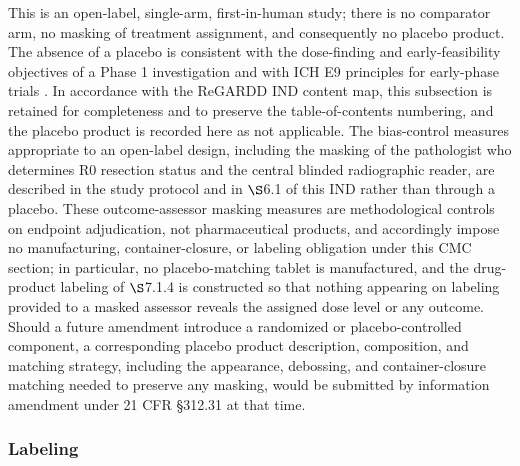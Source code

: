 This is an open-label, single-arm, first-in-human study; there is no comparator
arm, no masking of treatment assignment, and consequently no placebo product. The
absence of a placebo is consistent with the dose-finding and early-feasibility
objectives of a Phase 1 investigation and with ICH E9 principles for early-phase
trials \cite{ichpaistduni,phase1guidance}. In accordance with the ReGARDD IND
content map, this subsection is retained for completeness and to preserve the
table-of-contents numbering, and the placebo product is recorded here as not
applicable. The bias-control measures appropriate to an open-label design,
including the masking of the pathologist who determines R0 resection status and
the central blinded radiographic reader, are described in the study protocol and
in $\S$6.1 of this IND rather than through a placebo. These outcome-assessor
masking measures are methodological controls on endpoint adjudication, not
pharmaceutical products, and accordingly impose no manufacturing,
container-closure, or labeling obligation under this CMC section; in particular,
no placebo-matching tablet is manufactured, and the drug-product labeling of
$\S$7.1.4 is constructed so that nothing appearing on labeling provided to a
masked assessor reveals the assigned dose level or any outcome. Should a future
amendment introduce a randomized or placebo-controlled component, a corresponding
placebo product description, composition, and matching strategy, including the
appearance, debossing, and container-closure matching needed to preserve any
masking, would be submitted by information amendment under 21 CFR \S 312.31 at
that time.

\subsubsection{Labeling}

